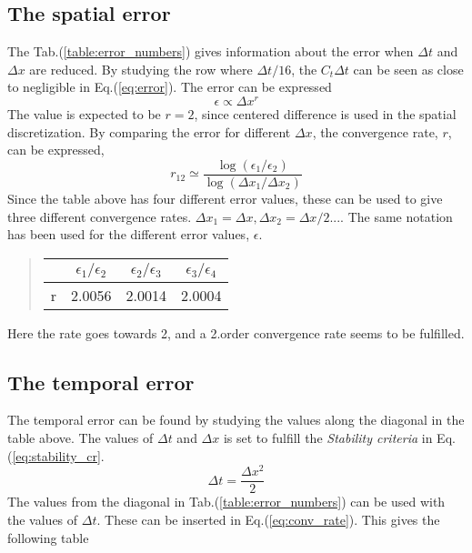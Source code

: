 \documentclass[%
twoside,                 %
final,                   %
chapterprefix=true,      %
open=right               %
10pt]{book}
\begin{document}
\subsection{The spatial error}
The Tab.(\ref{table:error_numbers}) gives information about the error when $\Delta t$ and $\Delta x$ are reduced. By studying the row where $\Delta t/16$, the $C_t \Delta t$ can be seen as close to negligible in Eq.(\ref{eq:error}). The error can be expressed 
\begin{equation}
    \epsilon \propto \Delta x^r
\end{equation}
The value is expected to be $r=2$, since centered difference is used in the spatial discretization. By comparing the error for different $\Delta x$, the convergence rate, $r$, can be expressed, 
\begin{equation} \label{eq:conv_rate}
 r_{12} \simeq \frac{\log(\epsilon_1/\epsilon_2)}{\log(\Delta x_1/\Delta x_2)}
\end{equation}
Since the table above has four different error values, these can be used to give three different convergence rates. $\Delta x_1 = \Delta x, \Delta x_2 = \Delta x/2...$. The same notation has been used for the different error values, $\epsilon$.

\begin{quote}
\begin{tabular}{cccc}
\hline
\multicolumn{1}{c}{  } & \multicolumn{1}{c}{ $\epsilon_1/\epsilon_2$ } & \multicolumn{1}{c}{ $\epsilon_2/\epsilon_3$ } & \multicolumn{1}{c}{ $\epsilon_3/\epsilon_4$ } \\
\hline
r & 2.0056                  & 2.0014                  & 2.0004                  \\
\hline
\end{tabular}
\end{quote}

\noindent
Here the rate goes towards 2, and a 2.order convergence rate seems to be fulfilled.
\subsection{The temporal error}
The temporal error can be found by studying  the values along the diagonal in the table above. The values of $\Delta t$ and $\Delta x$ is set to fulfill the \emph{Stability criteria} in Eq.(\ref{eq:stability_cr}.
\begin{equation} \label{eq:stability_cr}
 \Delta t = \frac{\Delta x^2}{2}
\end{equation}
The values from the diagonal in Tab.(\ref{table:error_numbers}) can be used with the values of $\Delta t$. These can be inserted in Eq.(\ref{eq:conv_rate}). This gives the following table
\end{document}
